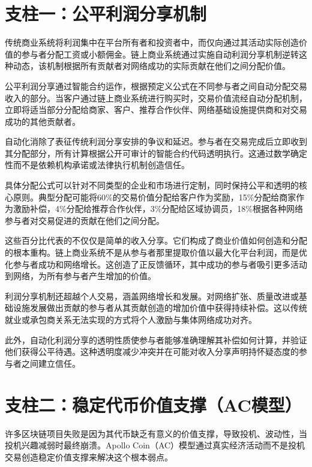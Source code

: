 \documentclass[
  Letterpaper,
]{scrbook}
\begin{document}
\section{支柱一：公平利润分享机制}\label{ux652fux67f1ux4e00ux516cux5e73ux5229ux6da6ux5206ux4eabux673aux5236}

传统商业系统将利润集中在平台所有者和投资者中，而仅向通过其活动实际创造价值的参与者分配工资或小额佣金。链上商业系统通过实施自动利润分享机制逆转这种动态，该机制根据所有贡献者对网络成功的实际贡献在他们之间分配价值。

公平利润分享通过智能合约运作，根据预定义公式在不同参与者之间自动分配交易收入的部分。当客户通过链上商业系统进行购买时，交易价值流经自动分配机制，立即将适当部分分配给商家、客户、推荐合作伙伴、网络基础设施提供商和对交易成功的其他贡献者。

自动化消除了表征传统利润分享安排的争议和延迟。参与者在交易完成后立即收到其分配部分，所有计算根据公开可审计的智能合约代码透明执行。这通过数学确定性而不是依赖机构承诺或法律执行机制创造信任。

具体分配公式可以针对不同类型的企业和市场进行定制，同时保持公平和透明的核心原则。典型分配可能将60\%的交易价值分配给客户作为奖励，15\%分配给商家作为激励补偿，4\%分配给推荐合作伙伴，3\%分配给区域协调员，18\%根据各种网络参与者对交易促进的贡献在他们之间分配。

这些百分比代表的不仅仅是简单的收入分享。它们构成了商业价值如何创造和分配的根本重构。链上商业系统不是从参与者那里提取价值以最大化平台利润，而是优化参与者成功和网络增长。这创造了正反馈循环，其中成功的参与者吸引更多活动到网络，为所有参与者产生增加的价值。

利润分享机制还超越个人交易，涵盖网络增长和发展。对网络扩张、质量改进或基础设施发展做出贡献的参与者从其贡献创造的增加价值中获得持续补偿。这以传统就业或承包商关系无法实现的方式将个人激励与集体网络成功对齐。

此外，自动化利润分享的透明性质使参与者能够准确理解其补偿如何计算，并验证他们获得公平待遇。这种透明度减少冲突并在可能对收入分享声明持怀疑态度的参与者之间建立信任。

\section{支柱二：稳定代币价值支撑（AC模型）}\label{ux652fux67f1ux4e8cux7a33ux5b9aux4ee3ux5e01ux4ef7ux503cux652fux6491acux6a21ux578b}

许多区块链项目失败是因为其代币缺乏有意义的价值支撑，导致投机、波动性，当投机兴趣减弱时最终崩溃。Apollo
Coin（AC）模型通过真实经济活动而不是投机交易创造稳定价值支撑来解决这个根本弱点。
\end{document}
